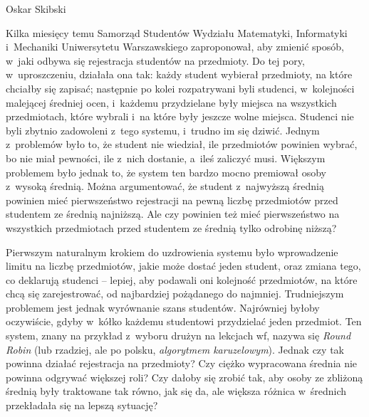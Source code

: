 

{Oskar Skibski}


Kilka miesięcy temu Samorząd Studentów Wydziału Matematyki, Informatyki i~Mechaniki Uniwersytetu Warszawskiego zaproponował, aby zmienić sposób, w~jaki odbywa się rejestracja studentów na przedmioty.
Do tej pory, w~uproszczeniu, działała ona tak: każdy student wybierał przedmioty, na które chciałby się zapisać; następnie po kolei rozpatrywani byli studenci, w~kolejności malejącej średniej ocen, i~każdemu przydzielane były miejsca na wszystkich przedmiotach, które wybrali i~na które były jeszcze wolne miejsca. 
Studenci nie byli zbytnio zadowoleni z~tego systemu, i~trudno im się dziwić. Jednym z~problemów było to, że student nie wiedział, ile przedmiotów powinien wybrać, bo nie miał pewności, ile z~nich dostanie, a~ileś zaliczyć musi. Większym problemem było jednak to, że system ten bardzo mocno premiował osoby z~wysoką średnią. 
Można argumentować, że student z~najwyższą średnią powinien mieć pierwszeństwo rejestracji na pewną liczbę przedmiotów przed studentem ze średnią najniższą. 
Ale czy powinien też mieć pierwszeństwo na wszystkich przedmiotach przed studentem ze średnią tylko odrobinę niższą? 

Pierwszym naturalnym krokiem do uzdrowienia systemu było wprowadzenie limitu na liczbę przedmiotów, jakie może dostać jeden student, oraz zmiana tego, co deklarują studenci -- lepiej, aby podawali oni kolejność przedmiotów, na które chcą się zarejestrować, od najbardziej pożądanego do najmniej.
Trudniejszym problemem jest jednak wyrównanie szans studentów.
Najrówniej byłoby oczywiście, gdyby w~kółko każdemu studentowi przydzielać jeden przedmiot. Ten system, znany na przykład z~wyboru drużyn na lekcjach wf, nazywa się \emph{Round Robin} (lub rzadziej, ale po polsku, \emph{algorytmem karuzelowym}).
Jednak czy tak powinna działać rejestracja na przedmioty? Czy ciężko wypracowana średnia nie powinna  odgrywać większej roli? Czy dałoby się zrobić tak, aby osoby ze zbliżoną średnią były traktowane tak równo, jak się da, ale większa różnica w~średnich przekładała się na lepszą sytuację?

